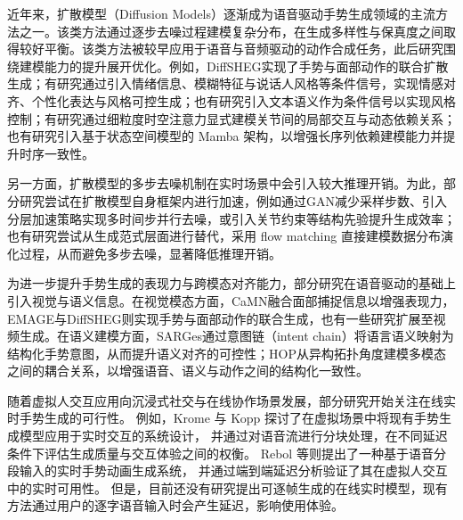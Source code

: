 近年来，扩散模型（Diffusion Models）\cite{diffusion}逐渐成为语音驱动手势生成领域的主流方法之一。该类方法通过逐步去噪过程建模复杂分布，在生成多样性与保真度之间取得较好平衡。该类方法被较早应用于语音与音频驱动的动作合成任务\cite{listen_denoise_action, zhu2023taming, diffusion-self-supervised2023}，此后研究围绕建模能力的提升展开优化。例如，DiffSHEG\cite{diffsheg}实现了手势与面部动作的联合扩散生成；有研究通过引入情绪信息、模糊特征与说话人风格等条件信号，实现情感对齐、个性化表达与风格可控生成\cite{emoDiffGes, PersonaGesture, diffstylegesture}；也有研究引入文本语义作为条件信号以实现风格控制\cite{Ao2023GestureDiffuCLIP}；有研究通过细粒度时空注意力显式建模关节间的局部交互与动态依赖关系\cite{wan-etal-2025-finegrained-spatiotemporal}；也有研究引入基于状态空间模型的 Mamba 架构\cite{gu2024mamba}，以增强长序列依赖建模能力并提升时序一致性\cite{fu2024mambagesture, Spatial-tempEnhancedGenerationModel, liu2025multimodal}。

另一方面，扩散模型的多步去噪机制在实时场景中会引入较大推理开销。为此，部分研究尝试在扩散模型自身框架内进行加速，例如通过GAN减少采样步数\cite{Cheng2025DIDiffGes, ConditionalGAN}、引入分层加速策略实现多时间步并行去噪\cite{Vu2026RollingDiffusion}，或引入关节约束等结构先验提升生成效率\cite{HoleGest2025}；也有研究尝试从生成范式层面进行替代，采用 flow matching 直接建模数据分布演化过程，从而避免多步去噪，显著降低推理开销\cite{liu2024GestureLSM}。

为进一步提升手势生成的表现力与跨模态对齐能力，部分研究在语音驱动的基础上引入视觉与语义信息。在视觉模态方面，CaMN\cite{beatcamn}融合面部捕捉信息以增强表现力，EMAGE\cite{emage}与DiffSHEG\cite{diffsheg}则实现手势与面部动作的联合生成，也有一些研究\cite{DiffTED2024, Chen2025Deviation, mahapatra2024cospeech, MMGT}扩展至视频生成。在语义建模方面，SARGes\cite{SARGes}通过意图链（intent chain）将语言语义映射为结构化手势意图，从而提升语义对齐的可控性；HOP\cite{cheng2025hop}从异构拓扑角度建模多模态之间的耦合关系，以增强语音、语义与动作之间的结构化一致性。

随着虚拟人交互应用向沉浸式社交与在线协作场景发展，部分研究开始关注在线实时手势生成的可行性。
例如，Krome 与 Kopp 探讨了在虚拟场景中将现有手势生成模型应用于实时交互的系统设计，
并通过对语音流进行分块处理，在不同延迟条件下评估生成质量与交互体验之间的权衡\cite{towards_realtime_co_speech_gesture_generation}。
Rebol 等则提出了一种基于语音分段输入的实时手势动画生成系统，
并通过端到端延迟分析验证了其在虚拟人交互中的实时可用性\cite{realtime_gesture_animation_generation}。
但是，目前还没有研究提出可逐帧生成的在线实时模型，现有方法通过用户的逐字语音输入时会产生延迟，影响使用体验。

